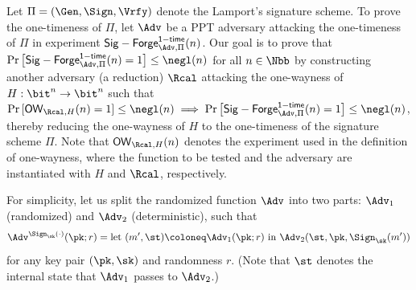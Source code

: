 \begin{answer}
    Let  $\Pi = (\Gen, \Sign, \Vrfy)$ denote the Lamport's signature scheme.
    To prove the one-timeness of $\Pi$, let $\Adv$ be a PPT adversary attacking the one-timeness of $\Pi$ in experiment $\mathsf{Sig-Forge}^{\mathsf{1-time}}_{\Adv, \Pi}(n)$. Our goal is to prove that $\Pr\left[\mathsf{Sig-Forge}^{\mathsf{1-time}}_{\Adv, \Pi}(n)=1\right] \le \negl(n)$ for all $n\in\Nbb$ by constructing another adversary (a reduction) $\Rcal$ attacking the one-wayness of $H:\bit^n\to \bit^n$ such that $\Pr\left[\mathsf{OW}_{\Rcal, H}(n)=1\right]\le \negl(n) \implies \Pr\left[\mathsf{Sig-Forge}^{\mathsf{1-time}}_{\Adv, \Pi}(n)=1\right] \le \negl(n)$, thereby reducing the one-wayness of $H$ to the one-timeness of the signature scheme $\Pi$. Note that $\mathsf{OW}_{\Rcal, H}(n)$ denotes the experiment used in the definition of one-wayness, where the function to be tested and the adversary are instantiated with $H$ and $\Rcal$, respectively.

    For simplicity, let us split the randomized function $\Adv$ into two parts: $\Adv_1$ (randomized) and $\Adv_2$ (deterministic), such that
    \[
        \Adv^{\Sign_\sk(\cdot)} (\pk; r) = \textrm{let } (m', \st)\coloneq \Adv_1(\pk; r) \textrm{ in } \Adv_2(\st, \pk, \Sign_\sk(m'))
    \]
    for any key pair $(\pk, \sk)$ and randomness $r$. (Note that $\st$ denotes the internal state that $\Adv_1$ passes to $\Adv_2$.)
    

\end{answer}

